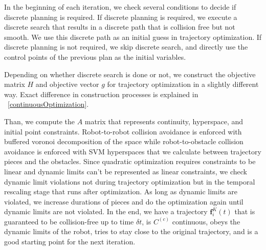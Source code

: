 \documentclass{svproc}
\newcommand{\vf}{\mathbf{f}}
\begin{document}
In the beginning of each iteration, we check several conditions to decide if discrete planning is required. If discrete planning is required, we execute a discrete search that results in a discrete path that is collision free but not smooth. We use this discrete path as an initial guess in trajectory optimization. If discrete planning is not required, we skip discrete search, and directly use the control points of the previous plan as the initial variables.

Depending on whether discrete search is done or not, we construct the objective matrix $H$ and objective vector $g$ for trajectory optimization in a slightly different way. Exact difference in construction processes is explained in ~\ref{continuousOptimization}.

Than, we compute the $A$ matrix that represents continuity, hyperspace, and initial point constraints. Robot-to-robot collision avoidance is enforced with buffered voronoi decomposition of the space while robot-to-obstacle collision avoidance is enforced with SVM hyperspaces that we calculate between trajectory pieces and the obstacles. Since quadratic optimization requires constraints to be linear and dynamic limits can't be represented as linear constraints, we check dynamic limit violations not during trajectory optimization but in the temporal rescaling stage that runs after optimization. As long as dynamic limits are violated, we increase durations of pieces and do the optimization again until dynamic limits are not violated. In the end, we have a trajectory $\vf^{K}_i(t)$ that is guaranteed to be collision-free up to time $\delta t$, is $C^{(c)}$ continuous, obeys the dynamic limits of the robot, tries to stay close to the original trajectory, and is a good starting point for the next iteration.
\end{document}

